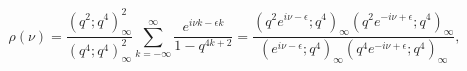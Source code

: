 \begin{equation}
\rho(\nu)=\frac{(q^2;q^4)_\infty^2}{(q^4;q^4)_\infty^2}
\sum_{k=-\infty}^\infty
\frac{e^{i\nu k-\epsilon k}}{1-q^{4k+2}}=
\frac{(q^2e^{i\nu-\epsilon};q^4)_\infty (q^2e^{-i\nu+\epsilon};q^4)_\infty}
{(e^{i\nu-\epsilon};q^4)_\infty (q^4e^{-i\nu+\epsilon};q^4)_\infty},
\label{nu}
\end{equation}

